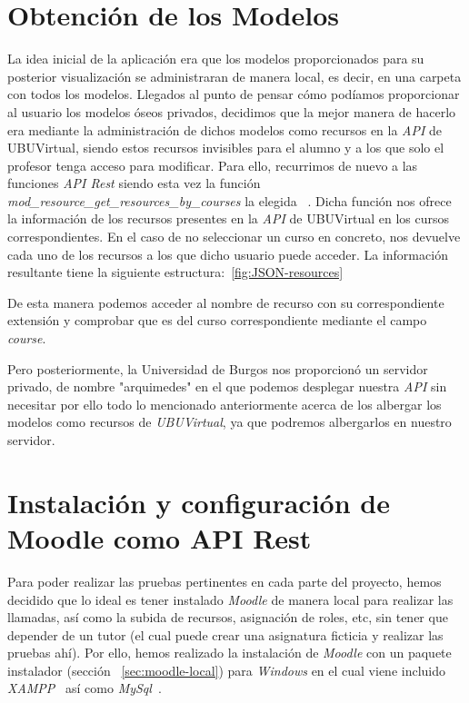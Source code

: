 \section{Obtención de los Modelos}
La idea inicial de la aplicación era que los modelos proporcionados para su posterior visualización se administraran de manera local, es decir, en una carpeta con todos los modelos. Llegados al punto de pensar cómo podíamos proporcionar al usuario los modelos óseos privados, decidimos que la mejor manera de hacerlo era mediante la administración de dichos modelos como recursos en la \textit{API} de UBUVirtual, siendo estos recursos invisibles para el alumno y a los que solo el profesor tenga acceso para modificar. Para ello, recurrimos de nuevo a las funciones \textit{API Rest} siendo esta vez la función \textit{mod_resource_get_resources_by_courses} la elegida ~\cite{moodle:web-service-api-functions}. Dicha función nos ofrece la información de los recursos presentes en la \textit{API} de UBUVirtual en los cursos correspondientes. En el caso de no seleccionar un curso en concreto, nos devuelve cada uno de los recursos a los que dicho usuario puede acceder. La información resultante tiene la siguiente estructura:~\ref{fig:JSON-resources}

De esta manera podemos acceder al nombre de recurso con su correspondiente extensión y comprobar que es del curso correspondiente mediante el campo \textit{course}.

Pero posteriormente, la Universidad de Burgos nos proporcionó un servidor privado, de nombre "arquimedes" en el que podemos desplegar nuestra \textit{API} sin necesitar por ello todo lo mencionado anteriormente acerca de los albergar los modelos como recursos de \textit{UBUVirtual}, ya que podremos albergarlos en nuestro servidor.

\section{Instalación y configuración de Moodle como API Rest}
Para poder realizar las pruebas pertinentes en cada parte del proyecto, hemos decidido que lo ideal es tener instalado \textit{Moodle} de manera local para realizar las llamadas, así como la subida de recursos, asignación de roles, etc, sin tener que depender de un tutor (el cual puede crear una asignatura ficticia y realizar las pruebas ahí). Por ello, hemos realizado la instalación de \textit{Moodle} con un paquete instalador (sección ~\ref{sec:moodle-local}) para \textit{Windows} en el cual viene incluido \textit{XAMPP}~\cite{wiki:xampp} así como \textit{MySql}~\cite{wiki:mysql}.

